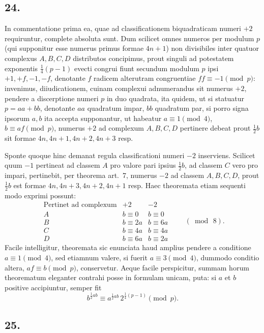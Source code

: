 \documentclass[12pt]{article}
\begin{document}
\subsection*{24.}

In commentatione prima ea, quae ad classificationem biquadraticam numeri $+2$ requiruntur, complete absoluta sunt. Dum scilicet omnes numeros per modulum $p$ (qui supponitur esse numerus primus formae $4n+1$) non divisibiles inter quatuor complexus $A,B,C,D$ distributos concipimus, prout singuli ad potestatem exponentis $\frac14(p-1)$ evecti congrui fiunt secundum modulum $p$ ipsi $+1,+f,-1,-f$, denotante $f$ radicem alterutram congruentiae $ff\equiv -1\pmod p$: invenimus, diiudicationem, cuinam complexui adnumerandus sit numerus $+2$, pendere a discerptione numeri $p$ in duo quadrata, ita quidem, ut si statuatur $p=aa+bb$, denotante $aa$ quadratum impar, $bb$ quadratum par, si porro signa ipsorum $a,b$ ita accepta supponantur, ut habeatur $a\equiv 1\pmod 4$, $b\equiv af\pmod p$, numerus $+2$ ad complexum $A,B,C,D$ pertinere debeat prout $\frac12 b$ sit formae $4n,4n+1,4n+2,4n+3$ resp.

Sponte quoque hinc demanat regula classificationi numeri $-2$ inserviens. Scilicet quum $-1$ pertineat ad classem $A$ pro valore pari ipsius $\frac12 b$, ad classem $C$ vero pro impari, pertinebit, per theorema art.~7, numerus $-2$ ad classem $A,B,C,D$, prout $\frac12 b$ est formae $4n,4n+3,4n+2,4n+1$ resp. Haec theoremata etiam sequenti modo exprimi possunt:
\[
\begin{array}{c|cc}
\text{Pertinet ad complexum} & +2 & -2\\
\hline
A & b\equiv 0 & b\equiv 0\\
B & b\equiv 2a & b\equiv 6a\\
C & b\equiv 4a & b\equiv 4a\\
D & b\equiv 6a & b\equiv 2a
\end{array}
\qquad(\bmod\,8).
\]
Facile intelligitur, theoremata sic enunciata haud amplius pendere a conditione $a\equiv 1\pmod 4$, sed etiamnum valere, si fuerit $a\equiv 3\pmod 4$, dummodo conditio altera, $af\equiv b\pmod p$, conservetur. Aeque facile perspicitur, summam horum theorematum eleganter contrahi posse in formulam unicam, puta: si $a$ et $b$ positive accipiuntur, semper fit
\[
b^{\frac12 ab}\equiv a^{\frac12 ab}\,2^{\frac14(p-1)}\pmod p.
\]

\subsection*{25.}
\end{document}
